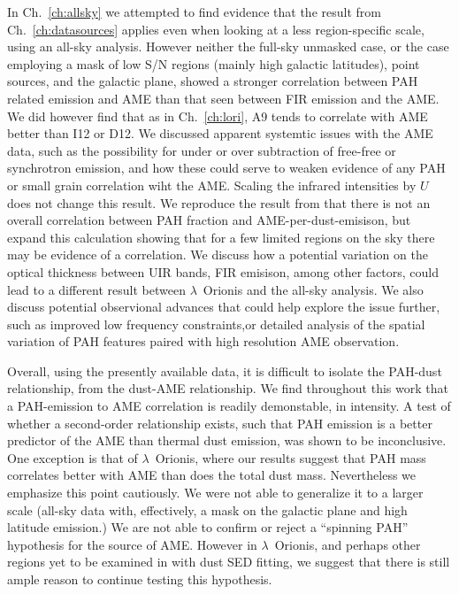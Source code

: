   In Ch.~\ref{ch:allsky} we attempted to find evidence that the result from Ch.~\ref{ch:datasources} applies even when looking at a less region-specific scale, using an all-sky analysis. However neither the full-sky unmasked case, or the case employing a mask of low S/N regions (mainly high galactic latitudes), point sources, and the galactic plane, showed a stronger correlation between PAH related emission and AME than that seen between FIR emission and the AME. We did however find that as in Ch.~\ref{ch:lori}, A9 tends to correlate with AME better than I12 or D12. We discussed apparent systemtic issues with the AME data, such as the possibility for under or over subtraction of free-free or synchrotron emission, and how these could serve to weaken evidence of any PAH or small grain correlation wiht the AME. Scaling the infrared intensities by $U$ does not change this result. We reproduce the result from \cite{hensley16} that there is not an overall correlation between PAH fraction and AME-per-dust-emisison, but expand this calculation showing that for a few limited regions on the sky there may be evidence of a correlation. We discuss how a potential variation on the optical thickness between UIR bands, FIR emisison, among other factors, could lead to a different result between $\lambda$~Orionis and the all-sky analysis. We also discuss potential observional advances that could help explore the issue further, such as improved low frequency constraints,or detailed analysis of the spatial variation of PAH features paired with high resolution AME observation.

  Overall, using the presently available data, it is difficult to isolate the PAH-dust relationship, from the dust-AME relationship. We find throughout this work that a PAH-emission to AME correlation is readily demonstable, in intensity. A test of whether a second-order relationship exists, such that PAH emission is a better predictor of the AME than thermal dust emission, was shown to be inconclusive. One exception is that of $\lambda$~Orionis, where our results suggest that PAH mass correlates better with AME than does the total dust mass. Nevertheless we emphasize this point cautiously. We were not able to generalize it to a larger scale (all-sky data with, effectively, a mask on the galactic plane and high latitude emission.)  We are not able to confirm or reject a ``spinning PAH'' hypothesis for the source of AME. However in $\lambda$~Orionis, and perhaps other regions yet to be examined in with dust SED fitting, we suggest that there is still ample reason to continue testing this hypothesis.
